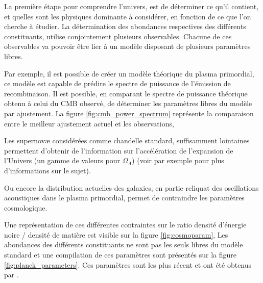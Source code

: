 La première étape pour comprendre l'univers, est de déterminer ce qu'il contient, et quelles sont les physiques dominante à considérer, en fonction de ce que l'on cherche à étudier.
La détermination des abondances respectives des différents constituants, utilise conjointement plusieurs observables.
Chacune de ces observables va pouvoir être lier à un modèle disposant de plusieurs paramètres libres.

Par exemple, il est possible de créer un modèle théorique du plasma primordial, ce modèle est capable de prédire le spectre de puissance de l'émission de recombinaison.
Il est possible, en comparant le spectre de puissance théorique obtenu à celui du \ac{CMB} observé, de déterminer les paramètres libres du modèle par ajustement.
La figure \ref{fig:cmb_power_spectrum} représente la comparaison entre le meilleur ajustement actuel et les observations, 

Les supernovæ considérées comme chandelle standard, suffisamment lointaines permettent d'obtenir de l'information sur l'accélération de l'expansion de l'Univers (un gamme de valeurs pour $\Omega_\Lambda$)
(voir par exemple \cite{1999ApJ...517..565P} pour plus d'informations sur le sujet).

Ou encore la distribution actuelles des galaxies, en partie reliquat des oscillations acoustiques dans le plasma primordial, permet de contraindre les paramètres cosmologique.



Une représentation de ces différentes contraintes sur le ratio densité d'énergie noire / densité de matière est visible sur la figure \ref{fig:cosmoparam},
Les abondances des différents constituants ne sont pas les seuls libres du modèle standard et une compilation de ces paramètres sont présentés sur la figure \ref{fig:planck_parameters}.
Ces paramètres sont les plus récent et ont été obtenus par \cite{planck_collaboration_planck_2016}.



